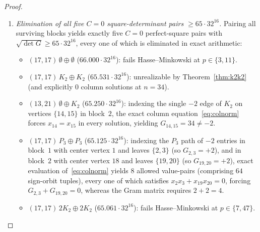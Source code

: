 \documentclass[11pt]{article}
\theoremstyle{remark}
\begin{document}
\begin{proof}
\begin{enumerate}[leftmargin=*,topsep=2pt,itemsep=1pt]
\begin{multline*}
\end{multline*}
using pruning tolerance $\theta_s - 10^{-6}$ (exceeding the certified Weyl bound $\delta_{\mathrm{Weyl}} < 2 \times 10^{-11}$ by a factor of more than $4 \times 10^4$). To prevent unsound deduplication, $(\operatorname{spec}(B_k),\, \operatorname{sorted}\{|(S_k^2)_{ij}|\})$ is used solely as a hash bucket: a matrix $S_2$ is discarded only after an explicit integer permutation-and-switching witness $(P, D)$ satisfying $P D S_1 D P^\top = S_2$ identically is constructed and verified. This yields exactly $143$ switching classes for $m_6 = 0$ and $8$ for $m_6 = 1$ across $s = 12, \dots, 22$.
\item \emph{Elimination of all five $C = 0$ square-determinant pairs $\ge 65 \cdot 32^{16}$.} Pairing all surviving blocks yields exactly five $C = 0$ perfect-square pairs with $\sqrt{\det G} \ge 65 \cdot 32^{16}$, every one of which is eliminated in exact arithmetic:
  \begin{itemize}[leftmargin=*,topsep=1pt,itemsep=1pt]
  \item $(17, 17)\,\emptyset \oplus \emptyset$ ($66.000 \cdot 32^{16}$): fails Hasse--Minkowski at $p \in \{3, 11\}$.
  \item $(17, 17)\, K_2 \oplus K_2$ ($65.531 \cdot 32^{16}$): unrealizable by Theorem~\ref{thm:k2k2} (and explicitly $0$ column solutions at $n = 34$).
  \item $(13, 21)\,\emptyset \oplus K_2$ ($65.250 \cdot 32^{16}$): indexing the single $-2$ edge of $K_2$ on vertices $\{14, 15\}$ in block~$2$, the exact column equation~\eqref{eq:colnorm} forces $x_{14} = x_{15}$ in every solution, yielding $G_{14,15} = 34 \ne -2$.
  \item $(17, 17)\, P_3 \oplus P_3$ ($65.125 \cdot 32^{16}$): indexing the $P_3$ path of $-2$ entries in block~$1$ with center vertex $1$ and leaves $\{2, 3\}$ (so $G_{2,3} = +2$), and in block~$2$ with center vertex $18$ and leaves $\{19, 20\}$ (so $G_{19,20} = +2$), exact evaluation of~\eqref{eq:colnorm} yields $8$ allowed value-pairs (comprising $64$ sign-orbit tuples), every one of which satisfies $x_2 x_3 + x_{19} x_{20} = 0$, forcing $G_{2,3} + G_{19,20} = 0$, whereas the Gram matrix requires $2 + 2 = 4$.
  \item $(17, 17)\, 2K_2 \oplus 2K_2$ ($65.061 \cdot 32^{16}$): fails Hasse--Minkowski at $p \in \{7, 47\}$.
  \end{itemize}

\end{enumerate}
\end{proof}
\end{document}
